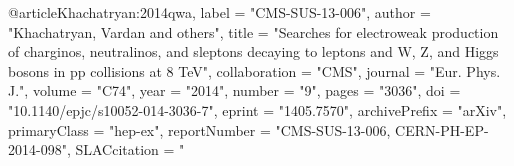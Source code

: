 @article{Khachatryan:2014qwa,
      label          = "CMS-SUS-13-006",
      author         = "Khachatryan, Vardan and others",
      title          = "{Searches for electroweak production of charginos,
                        neutralinos, and sleptons decaying to leptons and W, Z,
                        and Higgs bosons in pp collisions at 8 TeV}",
      collaboration  = "CMS",
      journal        = "Eur. Phys. J.",
      volume         = "C74",
      year           = "2014",
      number         = "9",
      pages          = "3036",
      doi            = "10.1140/epjc/s10052-014-3036-7",
      eprint         = "1405.7570",
      archivePrefix  = "arXiv",
      primaryClass   = "hep-ex",
      reportNumber   = "CMS-SUS-13-006, CERN-PH-EP-2014-098",
      SLACcitation   = "%
}


